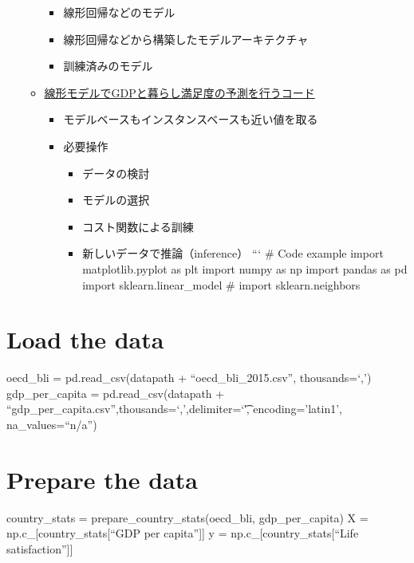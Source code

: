\begin{itemize}
\begin{itemize}
    \begin{itemize}
    \tightlist
    \item
      線形回帰などのモデル
    \item
      線形回帰などから構築したモデルアーキテクチャ
    \item
      訓練済みのモデル
    \end{itemize}
  \item
    \href{https://github.com/ageron/handson-ml2/blob/master/01_the_machine_learning_landscape.ipynb}{線形モデルでGDPと暮らし満足度の予測を行うコード}

    \begin{itemize}
    \tightlist
    \item
      モデルベースもインスタンスベースも近い値を取る
    \item
      必要操作

      \begin{itemize}
      \tightlist
      \item
        データの検討
      \item
        モデルの選択
      \item
        コスト関数による訓練
      \item
        新しいデータで推論（inference） ``` \# Code example import
        matplotlib.pyplot as plt import numpy as np import pandas as pd
        import sklearn.linear\_model \# import sklearn.neighbors
      \end{itemize}
    \end{itemize}
  \end{itemize}
\end{itemize}

\hypertarget{load-the-data}{%
\section{Load the data}\label{load-the-data}}

oecd\_bli = pd.read\_csv(datapath + ``oecd\_bli\_2015.csv'',
thousands=`,') gdp\_per\_capita = pd.read\_csv(datapath +
``gdp\_per\_capita.csv'',thousands=`,',delimiter=`\t',
encoding='latin1', na\_values=``n/a'')

\hypertarget{prepare-the-data}{%
\section{Prepare the data}\label{prepare-the-data}}

country\_stats = prepare\_country\_stats(oecd\_bli, gdp\_per\_capita) X
= np.c\_{[}country\_stats{[}``GDP per capita''{]}{]} y =
np.c\_{[}country\_stats{[}``Life satisfaction''{]}{]}

